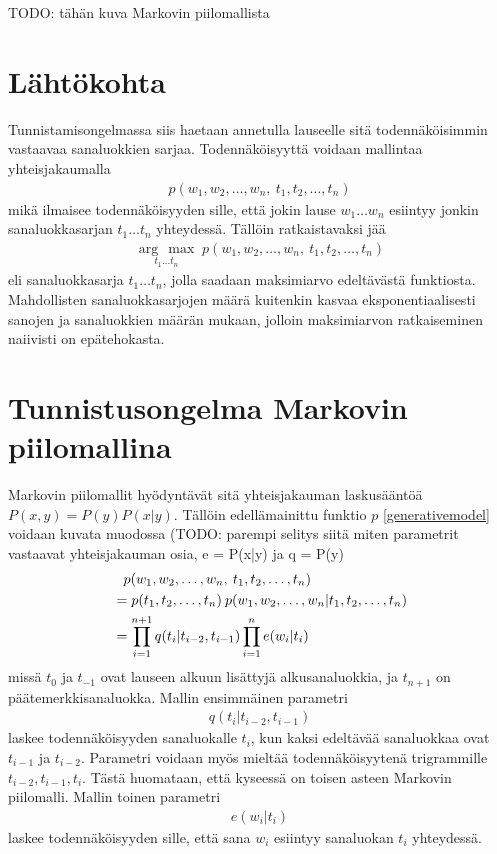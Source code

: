 \documentclass[utf8,bachelor,manualbib]{gradu3}
\newcommand{\argmax}[1]{\underset{#1}{\operatorname{arg}\,\operatorname{max}}\;}
\begin{document}
TODO: tähän kuva Markovin piilomallista


\section{Lähtökohta}

Tunnistamisongelmassa siis haetaan annetulla lauseelle sitä todennäköisimmin vastaavaa sanaluokkien sarjaa. Todennäköisyyttä voidaan mallintaa yhteisjakaumalla
\begin{align}
p(w_1, w_2, \ldots, w_n,\: t_1, t_2, \ldots, t_n)
\label{generativemodel}
\end{align}
mikä ilmaisee todennäköisyyden sille, että jokin lause $ w_1 \ldots w_n $ esiintyy jonkin sanaluokkasarjan $ t_1 \ldots t_n $ yhteydessä. Tällöin ratkaistavaksi jää
\begin{align}
\argmax{t_1 \ldots t_n} p(w_1, w_2, \ldots, w_n,\: t_1, t_2, \ldots, t_n)
\end{align}
eli sanaluokkasarja $ t_1 \ldots t_n $, jolla saadaan maksimiarvo edeltävästä funktiosta. Mahdollisten sanaluokkasarjojen määrä kuitenkin kasvaa eksponentiaalisesti sanojen ja sanaluokkien määrän mukaan, jolloin maksimiarvon ratkaiseminen naiivisti on epätehokasta.

\section{Tunnistusongelma Markovin piilomallina}

Markovin piilomallit hyödyntävät sitä yhteisjakauman laskusääntöä $P(x,y) = P(y)P(x|y)$. Tällöin edellämainittu funktio $ p $ \eqref{generativemodel} voidaan kuvata muodossa (TODO: parempi selitys siitä miten parametrit vastaavat yhteisjakauman osia, e = P(x|y) ja q = P(y)
\begin{align}
& \hphantom{= } p(w_1, w_2, \ldots, w_n,\: t_1, t_2, \ldots, t_n) \\
& = p(t_1, t_2, \ldots, t_n)\:p(w_1, w_2, \ldots, w_n|t_1, t_2, \ldots, t_n) \\
& = \prod_{i=1}^{n+1} q(t_i | t_{i-2}, t_{i-1}) \prod_{i=1}^{n}e(w_i | t_i)
\end{align}
missä $t_0$ ja $t_{-1}$ ovat lauseen alkuun lisättyjä alkusanaluokkia, ja $t_{n+1}$ on päätemerkkisanaluokka. Mallin ensimmäinen parametri
\begin{align}
q(t_i | t_{i-2}, t_{i-1})
\end{align}
laskee todennäköisyyden sanaluokalle $t_i$, kun kaksi edeltävää sanaluokkaa ovat $t_{i-1}$ ja $t_{i-2}$. Parametri voidaan myös mieltää todennäköisyytenä trigrammille $t_{i-2}, t_{i-1}, t_i $. Tästä huomataan, että kyseessä on toisen asteen Markovin piilomalli. Mallin toinen parametri
\begin{align}
e(w_i | t_i)
\end{align}
laskee todennäköisyyden sille, että sana $w_i$ esiintyy sanaluokan $t_i$ yhteydessä.
\end{document}
